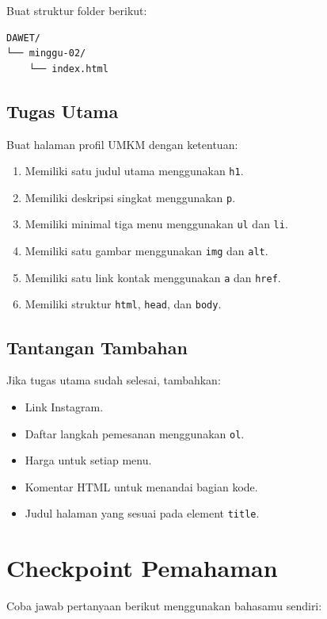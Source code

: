 \documentclass[11pt,a4paper]{article}
\begin{document}
Buat struktur folder berikut:

\begin{lstlisting}[style=htmlstyle]
DAWET/
└── minggu-02/
    └── index.html
\end{lstlisting}

\subsection{Tugas Utama}

Buat halaman profil UMKM dengan ketentuan:

\begin{enumerate}[label=\arabic*.]
    \item Memiliki satu judul utama menggunakan \texttt{h1}.
    \item Memiliki deskripsi singkat menggunakan \texttt{p}.
    \item Memiliki minimal tiga menu menggunakan \texttt{ul} dan \texttt{li}.
    \item Memiliki satu gambar menggunakan \texttt{img} dan \texttt{alt}.
    \item Memiliki satu link kontak menggunakan \texttt{a} dan \texttt{href}.
    \item Memiliki struktur \texttt{html}, \texttt{head}, dan \texttt{body}.
\end{enumerate}

\subsection{Tantangan Tambahan}

Jika tugas utama sudah selesai, tambahkan:

\begin{itemize}
    \item Link Instagram.
    \item Daftar langkah pemesanan menggunakan \texttt{ol}.
    \item Harga untuk setiap menu.
    \item Komentar HTML untuk menandai bagian kode.
    \item Judul halaman yang sesuai pada element \texttt{title}.
\end{itemize}

\section{Checkpoint Pemahaman}

Coba jawab pertanyaan berikut menggunakan bahasamu sendiri:
\end{document}

